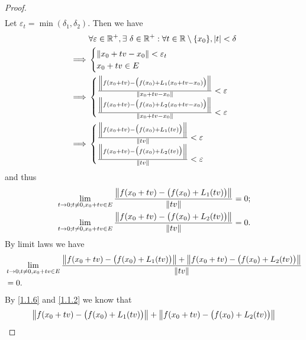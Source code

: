 \begin{proof}
\begin{align*}
  \end{align*}
  Let \(\varepsilon_t = \min(\delta_1, \delta_2)\).
  Then we have
  \begin{align*}
             & \forall \varepsilon \in \R^+, \exists\ \delta \in \R^+ : \forall t \in \R \setminus \{x_0\}, \abs{t} < \delta \\
    \implies & \begin{cases}
                 \norm*{x_0 + tv - x_0} < \varepsilon_t \\
                 x_0 + tv \in E
               \end{cases}                                                                        \\
    \implies & \begin{cases}
                 \frac{\norm*{f(x_0 + tv) - \big(f(x_0) + L_1(x_0 + tv - x_0)\big)}}{\norm*{x_0 + tv - x_0}} < \varepsilon \\
                 \frac{\norm*{f(x_0 + tv) - \big(f(x_0) + L_2(x_0 + tv - x_0)\big)}}{\norm*{x_0 + tv - x_0}} < \varepsilon
               \end{cases}                                           \\
    \implies & \begin{cases}
                 \frac{\norm*{f(x_0 + tv) - \big(f(x_0) + L_1(tv)\big)}}{\norm*{tv}} < \varepsilon \\
                 \frac{\norm*{f(x_0 + tv) - \big(f(x_0) + L_2(tv)\big)}}{\norm*{tv}} < \varepsilon
               \end{cases}
  \end{align*}
  and thus
  \begin{align*}
     & \lim_{t \to 0 ; t \neq 0, x_0 + tv \in E} \frac{\norm*{f(x_0 + tv) - \big(f(x_0) + L_1(tv)\big)}}{\norm*{tv}} = 0; \\
     & \lim_{t \to 0 ; t \neq 0, x_0 + tv \in E} \frac{\norm*{f(x_0 + tv) - \big(f(x_0) + L_2(tv)\big)}}{\norm*{tv}} = 0.
  \end{align*}
  By limit laws we have
  \begin{align*}
     & \lim_{t \to 0 ; t \neq 0, x_0 + tv \in E} \frac{\norm*{f(x_0 + tv) - \big(f(x_0) + L_1(tv)\big)} + \norm*{f(x_0 + tv) - \big(f(x_0) + L_2(tv)\big)}}{\norm*{tv}} \\
     & = 0.
  \end{align*}
  By \cref{1.1.6} and \cref{1.1.2} we know that
  \begin{align*}
     & \norm*{f(x_0 + tv) - \big(f(x_0) + L_1(tv)\big)} + \norm*{f(x_0 + tv) - \big(f(x_0) + L_2(tv)\big)}   \\

\end{align*}
\end{proof}
